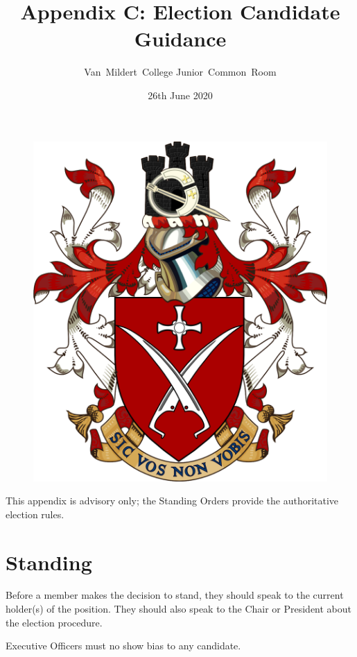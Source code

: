 \documentclass[12pt]{article}
\title{Appendix C: Election Candidate Guidance}
\author{Van~Mildert~College Junior~Common~Room}
\date{26th June 2020}
\begin{document}
    \begin{titlepage}  %
        \maketitle
        \begin{figure}[h]
            \includegraphics[scale=0.25]{arms}  %
            \centering
        \end{figure}
        \thispagestyle{empty}
    \end{titlepage}
    \setcounter{page}{2}  %

    This appendix is advisory only; the Standing Orders provide the authoritative election rules.

    \section{Standing}
    Before a member makes the decision to stand, they should speak to the current holder(s) of the position. They should also speak to the Chair or President about the election procedure.

    Executive Officers must no show bias to any candidate.
\end{document}
